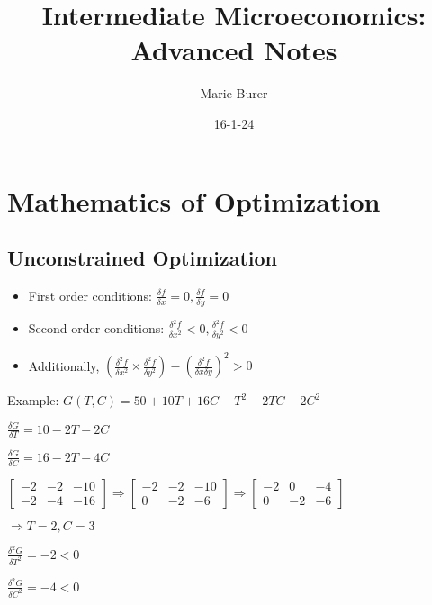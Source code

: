 \documentclass[12pt]{article}
\title{Intermediate Microeconomics: Advanced Notes}
\author{Marie Burer}
\date{16-1-24}
\begin{document}
\maketitle
\newpage
\setlength{\parindent}{0pt}

\tableofcontents

\newpage

\section{Mathematics of Optimization}

\subsection{Unconstrained Optimization}

\begin{itemize}
    \item First order conditions: $\frac{\delta f}{\delta x} = 0, \frac{\delta f}{\delta y} = 0$
    \item Second order conditions: $\frac{\delta^{2} f}{\delta x^{2}} < 0, \frac{\delta^{2} f}{\delta y^{2}} < 0$
    \item Additionally, $(\frac{\delta^{2} f}{\delta x^{2}} \times \frac{\delta^{2} f}{\delta y^{2}}) - (\frac{\delta^{2} f}{\delta x \delta y})^{2} > 0$
\end{itemize}

Example: $G(T,C) = 50 + 10T + 16C - T^{2} - 2TC - 2C^{2}$

$\frac{\delta G}{\delta T} = 10 - 2T - 2C$

$\frac{\delta G}{\delta C} = 16 - 2T - 4C$

$\begin{bmatrix}
    -2 & -2 & -10 \\
    -2 & -4 & -16
\end{bmatrix} \Rightarrow \begin{bmatrix}
    -2 & -2 & -10 \\
    0 & -2 & -6
\end{bmatrix} \Rightarrow \begin{bmatrix}
    -2 & 0 & -4 \\
    0 & -2 & -6
\end{bmatrix}$

$\Rightarrow T = 2, C = 3$

$\frac{\delta^{2} G}{\delta T^{2}} = -2 < 0$

$\frac{\delta^{2} G}{\delta C^{2}} = -4 < 0$
\end{document}
